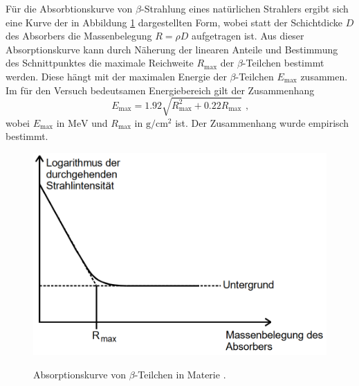 Für die Absorbtionskurve von $\beta$-Strahlung eines natürlichen Strahlers ergibt sich eine Kurve der in Abbildung \ref{fig:kurvenverlauf2} dargestellten Form, wobei statt der Schichtdicke $D$ des Absorbers die Massenbelegung $R = \rho D$ aufgetragen ist. Aus dieser Absorptionskurve kann durch Näherung der linearen Anteile und Bestimmung des Schnittpunktes die maximale Reichweite $R_\text{max}$ der $\beta$-Teilchen bestimmt werden. Diese hängt mit der maximalen Energie der $\beta$-Teilchen $E_\text{max}$ zusammen. Im für den Versuch bedeutsamen Energiebereich gilt der Zusammenhang
\begin{equation}
	E_\text{max}=1.92 \sqrt{R_\text{max}^2 + 0.22 R_\text{max}}\text{ ,}
\end{equation}
wobei $E_\text{max}$ in $\si{\mega\electronvolt}$ und $R_\text{max}$ in $\si{\gram\per\centi\meter\squared}$ ist.
Der Zusammenhang wurde empirisch bestimmt.









\begin{figure}
	\centering
	\caption{Absorptionskurve von $\beta$-Teilchen in Materie \cite{V704}.}
	\includegraphics[width=\linewidth-170pt,height=\textheight-170pt,keepaspectratio]{content/images/kurvenverlauf2.png}
	\label{fig:kurvenverlauf2}
\end{figure}




